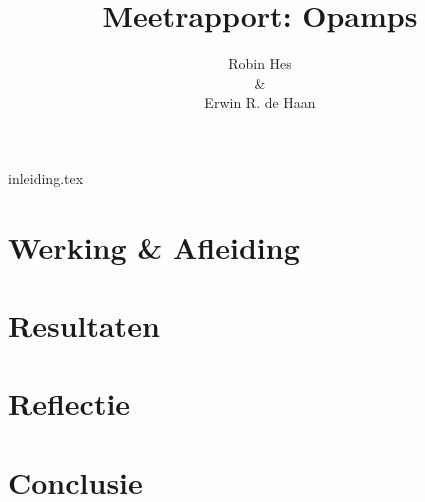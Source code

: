 \documentclass{report}
\title{Meetrapport: Opamps}
\author{Robin Hes\\\&\\Erwin R. de Haan}
\begin{document}
\maketitle
\tableofcontents

{inleiding.tex}
\chapter{Werking \& Afleiding}
\chapter{Resultaten}
\chapter{Reflectie}
\chapter{Conclusie}
\printbibliography
\end{document}
